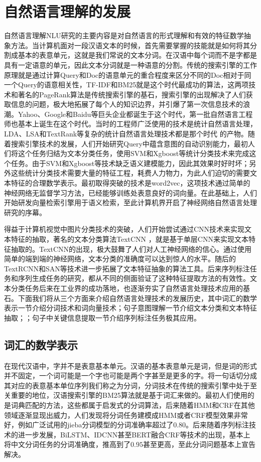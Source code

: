 \documentclass[twoside,a4paper,12pt]{book}%
\begin{document}
\section{自然语言理解的发展}
自然语言理解\gls{NLU}研究的主要内容是对自然语言的形式理解和有效的特征数学抽象方法。当计算机面对一段汉语文本的时候，首先需要掌握的技能就是如何将其分割成基本的表意单元，这就是我们常说的文本分词。在汉语中每个词而不是字都是具有一定语意的单元，因此文本分词就是一种语意的分割。传统的搜索引擎的工作原理就是通过计算Query和Doc的语意单元的重合程度来区分不同的Doc相对于同一个Query的语意相关性，TF-IDF和BM25就是这个时代最成功的算法，这两项技术和著名的PageRank算法是传统搜索引擎的基石，搜索引擎的出现解决了人们获取信息的问题，极大地拓展了每个人的知识边界，并引爆了第一次信息技术的浪潮。Yahoo、Google和Baidu等巨头企业都诞生于这个时代，第一批自然语言工程师也基本上诞生在这个时代。当时的工程师广泛使用的技术是统计自然语言处理，\gls{LDA}、\gls{LSA}和TextRank等复杂的统计自然语言处理技术都是那个时代
的产物。随着搜索引擎技术的发展，人们开始研究Query中蕴含意图的自动识别能力，最初人们将这个任务归结为文本分类任务，使用\gls{SVM}和Xgboost等统计分类技术来完成这个任务。由于\gls{SVM}和Xgboost等技术缺乏语义建模能力，因此其效果时好时坏；另外这些统计分类技术需要大量的特征工程，耗费人力物力，为此人们迫切的需要文本特征的合理数学表示。最初取得突破的技术是word2vec，这项技术通过简单的神经网络无监督学习方法，已经能够训练处表意良好的词向量。在此基础上，人们开始研发向量检索引擎用于语义检索，至此计算机界开启了神经网络自然语言处理研究的序幕。

得益于计算机视觉中图片分类技术的突破，人们开始尝试通过\gls{CNN}技术来实现文本特征的抽取，著名的文本分类算法TextCNN ，就是基于单层\gls{CNN}来实现文本特征抽取的。TextCNN的出现，极大鼓舞了人们对人工神经网络的信心。通过使用简单的端到端的神经网络，文本分类的准确度可以达到惊人的水平。随后的TextRCNN和\gls{SAN}等技术进一步拓展了文本特征抽象的算法工具。后来序列标注任务和序列生成任务的研究，都从不同的侧面验证了这种特征提取方法的有效性。文本分类任务后来在工业界的成功落地，也逐渐夯实了自然语言处理技术应用的基石。下面我们将从三个方面来介绍自然语言处理技术的发展历史，其中词汇的数学表示一节介绍分词技术和词向量技术；句子意图理解一节介绍文本分类和文本特征抽取；；句子中关键信息提取一节介绍序列标注任务极其应用。

\subsection{词汇的数学表示}
在现代汉语中，字并不是表意基本单元。汉语的基本表意单元是词，但是词的形式并不固定，一个词可能是一个字也可能是两个字甚至是更多的字。将一句话切分成其对应的表意基本单位序列我们称之为分词，分词技术在传统的搜索引擎中处于至关重要的地位，汉语搜索引擎的BM25算法就是基于词汇来做的。最初人们使用的是词典匹配的方法，这些都属于启发式的分词算法，后来随着\gls{HMM}和\gls{CRF}在其他领域逐渐显现出威力，人们发现将分词任务建模成\gls{HMM}或者\gls{CRF}模型效果非常好，例如广泛试用的jieba分词模型的分词准确率超过了$0.80$。后来随着序列标注技术的进一步发展，Bi\gls{LSTM}、\gls{IDCNN}甚至\gls{BERT}融合\gls{CRF}等技术的出现，基本上将中文分词任务的分词准确度，推高到了$0.95$甚至更高，至此分词问题基本上宣告解决。
\end{document}
